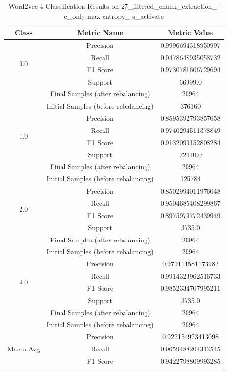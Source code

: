 \begin{longtable}{|c|c|c|}
\caption{Word2vec 4 Classification Results on 27\_filtered\_chunk\_extraction\_-e\_only-max-entropy\_-s\_activate} \label{tab:27_filtered_chunk_extraction_-e_only-max-entropy_-s_activate_word2vec_4_classifiers_results} \\
\hline
Class & Metric Name & Metric Value \\
\hline
\multirow{4}{*}{0.0} & Precision & 0.9996694318950997 \\
 & Recall & 0.9478648935058732 \\
 & F1 Score & 0.9730781606729694 \\
 & Support & 66999.0 \\
 & Final Samples (after rebalancing) & 20964 \\
 & Initial Samples (before rebalancing) & 376160 \\
\hline
\multirow{4}{*}{1.0} & Precision & 0.8595392793857058 \\
 & Recall & 0.9740294511378849 \\
 & F1 Score & 0.9132099152808284 \\
 & Support & 22410.0 \\
 & Final Samples (after rebalancing) & 20964 \\
 & Initial Samples (before rebalancing) & 125784 \\
\hline
\multirow{4}{*}{2.0} & Precision & 0.8502994011976048 \\
 & Recall & 0.9504685408299867 \\
 & F1 Score & 0.8975979772439949 \\
 & Support & 3735.0 \\
 & Final Samples (after rebalancing) & 20964 \\
 & Initial Samples (before rebalancing) & 20964 \\
\hline
\multirow{4}{*}{4.0} & Precision & 0.979111581173982 \\
 & Recall & 0.9914323962516733 \\
 & F1 Score & 0.9852334707995211 \\
 & Support & 3735.0 \\
 & Final Samples (after rebalancing) & 20964 \\
 & Initial Samples (before rebalancing) & 20964 \\
\hline
\multirow{4}{*}{Macro Avg} & Precision & 0.922154923413098 \\
 & Recall & 0.9659488204313545 \\
 & F1 Score & 0.9422798809993285 \\

\end{longtable}
